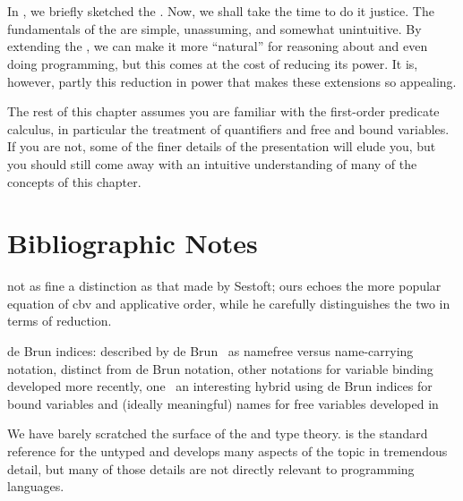 \label{functional:theory}

\section{\LambdaCalc}
In , we briefly sketched the \lambdacalc{}. Now, we shall take the time to do it justice. The fundamentals of the \lambdacalc are simple, unassuming, and somewhat unintuitive. By extending the \lambdacalc{}, we can make it more ``natural'' for reasoning about and even doing programming, but this comes at the cost of reducing its power. It is, however, partly this reduction in power that makes these extensions so appealing.

The rest of this chapter assumes you are familiar with the first-order predicate calculus, in particular the treatment of quantifiers and free and bound variables. If you are not, some of the finer details of the presentation will elude you, but you should still come away with an intuitive understanding of many of the concepts of this chapter.




\section{Bibliographic Notes}
not as fine a distinction as that made by Sestoft; ours echoes the more popular equation of cbv and applicative order, while he carefully distinguishes the two in terms of \lambdacalc reduction.

de Bru\ij n indices: described by de Bru\ij n~\citep{Bruijn:Lambda:1972} as namefree versus name-carrying notation, distinct from de Bru\ij n notation, other notations for variable binding developed more recently, one~\citep{McBride:Functional:2004} an interesting hybrid using de Bru\ij n indices for bound variables and (ideally meaningful) names for free variables developed in 

We have barely scratched the surface of the \lambdacalc and type theory. \citet{Barendregt:The-Lambda:1984} is the standard reference for the untyped \lambdacalc and develops many aspects of the topic in tremendous detail, but many of those details are not directly relevant to programming languages.

